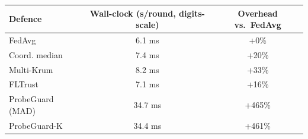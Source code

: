 \begin{tabular}{@{}lcc@{}}
\toprule
Defence & Wall-clock (s/round, digits-scale) & Overhead vs.\ FedAvg\\
\midrule
FedAvg & 6.1 ms & +0\%\\
Coord. median & 7.4 ms & +20\%\\
Multi-Krum & 8.2 ms & +33\%\\
FLTrust & 7.1 ms & +16\%\\
ProbeGuard (MAD) & 34.7 ms & +465\%\\
ProbeGuard-K & 34.4 ms & +461\%\\
\bottomrule
\end{tabular}
